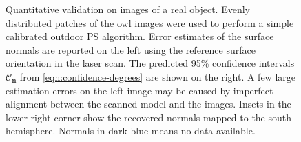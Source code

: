 \begin{figure}[t]
\begin{minipage}{0.5\linewidth}
    \end{minipage}
    \caption[Qualitative validation on images of a real object]{Quantitative validation on images of a real object. Evenly distributed patches of the owl images were used to perform a simple calibrated outdoor PS algorithm. Error estimates of the surface normals are reported on the left using the reference surface orientation in the laser scan. The predicted 95\% confidence intervals $\mathcal{C}_\mathbf{n}$ from \eqref{eqn:confidence-degrees} are shown on the right. A few large estimation errors on the left image may be caused by imperfect alignment between the scanned model and the images. Insets in the lower right corner show the recovered normals mapped to the south hemisphere. Normals in dark blue means no data available.}
    \label{fig:reconstruction:results}
\end{figure}







